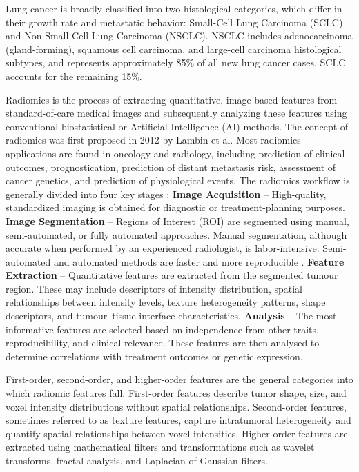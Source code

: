 \documentclass{iopjournal}
\begin{document}
Lung cancer is broadly classified into two histological categories, which
differ in their growth rate and metastatic behavior: Small-Cell Lung Carcinoma
(SCLC) and Non-Small Cell Lung Carcinoma (NSCLC). NSCLC includes
adenocarcinoma (gland-forming), squamous cell carcinoma, and large-cell
carcinoma histological subtypes, and represents approximately 85\% of all new
lung cancer cases. SCLC accounts for the remaining 15\%.

Radiomics is the process of extracting quantitative, image-based features from
standard-of-care medical images and subsequently analyzing these features using
conventional biostatistical or Artificial Intelligence (AI) methods. The
concept of radiomics was first proposed in 2012 \cite{lambin2012radiomics} by
Lambin et al. Most radiomics applications are found in oncology and radiology,
including prediction of clinical outcomes, prognostication, prediction of
distant metastasis risk, assessment of cancer genetics, and prediction of
physiological events. The radiomics workflow is generally divided into four key
stages \cite{zhang2023radiomics}: \textbf{Image Acquisition} -- High-quality,
standardized imaging is obtained for diagnostic or treatment-planning purposes.
\textbf{Image Segmentation} -- Regions of Interest (ROI) are segmented using
manual, semi-automated, or fully automated approaches. Manual segmentation,
although accurate when performed by an experienced radiologist, is
labor-intensive. Semi-automated and automated methods are faster and more
reproducible \cite{lambin2012radiomics}. \textbf{Feature Extraction} --
Quantitative features are extracted from the segmented tumour region. These may
include descriptors of intensity distribution, spatial relationships between
intensity levels, texture heterogeneity patterns, shape descriptors, and
tumour--tissue interface characteristics. \textbf{Analysis} -- The most
informative features are selected based on independence from other traits,
reproducibility, and clinical relevance. These features are then analysed to
determine correlations with treatment outcomes or genetic expression.

First-order, second-order, and higher-order features are the general categories
into which radiomic features fall. First-order features describe tumor shape,
size, and voxel intensity distributions without spatial relationships.
Second-order features, sometimes referred to as texture features, capture
intratumoral heterogeneity and quantify spatial relationships between voxel
intensities. Higher-order features are extracted using mathematical filters and
transformations such as wavelet transforms, fractal analysis, and Laplacian of
Gaussian filters.
\end{document}
